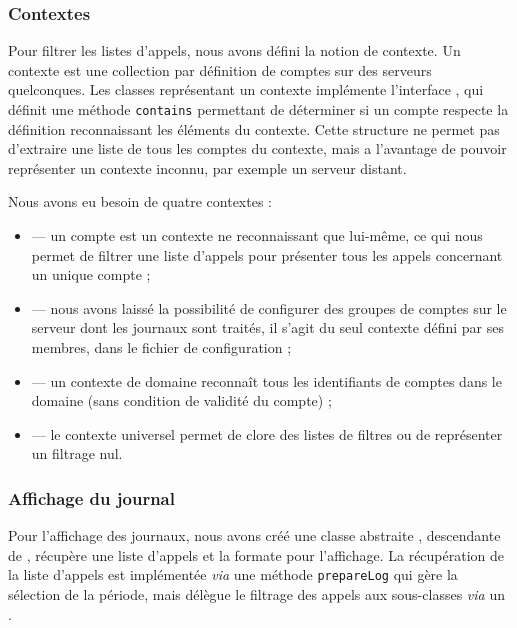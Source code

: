 \newpage

\subsubsection{Contextes}

Pour filtrer les listes d’appels, nous avons défini la notion de contexte. Un contexte est une collection par définition de comptes sur des serveurs quelconques. Les classes représentant un contexte implémente l’interface , qui définit une méthode \texttt{contains} permettant de déterminer si un compte respecte la définition reconnaissant les éléments du contexte. Cette structure ne permet pas d’extraire une liste de tous les comptes du contexte, mais a l’avantage de pouvoir représenter un contexte inconnu, par exemple un serveur distant.

Nous avons eu besoin de quatre contextes :
\begin{itemize}
	\item {} — un compte est un contexte ne reconnaissant que lui-même, ce qui nous permet de filtrer une liste d’appels pour présenter tous les appels concernant un unique compte ;
	\item {} — nous avons laissé la possibilité de configurer des groupes de comptes sur le serveur dont les journaux sont traités, il s’agit du seul contexte défini par ses membres, dans le fichier de configuration ;
	\item {} — un contexte de domaine reconnaît tous les identifiants de comptes dans le domaine (sans condition de validité du compte) ;
	\item {} — le contexte universel permet de clore des listes de filtres ou de représenter un filtrage nul.
\end{itemize}

\subsubsection{Affichage du journal}

Pour l’affichage des journaux, nous avons créé une classe abstraite , descendante de , récupère une liste d’appels  et la formate pour l’affichage. La récupération de la liste d’appels est implémentée \textit{via} une méthode \texttt{prepareLog} qui gère la sélection de la période, mais délègue le filtrage des appels aux sous-classes \textit{via} un .

